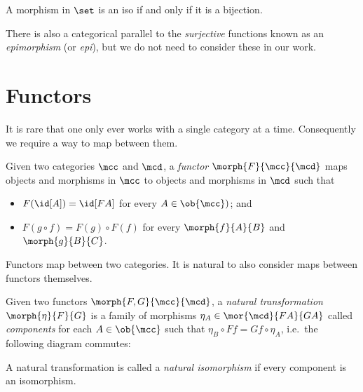 \begin{example}
    A morphism in \(\set\) is an iso if and only if it is a bijection.
\end{example}

\begin{remark}
    There is also a categorical parallel to the \emph{surjective} functions
    known as an \emph{epimorphism} (or \emph{epi}), but we do not need to
    consider these in our work.
\end{remark}

\section{Functors}

It is rare that one only ever works with a single category at a time.
Consequently we require a way to map between them.

\begin{definition}[Functor]
    Given two categories \(\mcc\) and \(\mcd\), a \emph{functor} \(
        \morph{F}{\mcc}{\mcd}
    \) maps objects and morphisms in \(\mcc\) to objects and morphisms in
    \(\mcd\) such that
    \begin{itemize}
        \item \(F(\id[A]) = \id[FA]\) for every \(A \in \ob{\mcc})\); and
        \item \(F(g \circ f) = F(g) \circ F(f)\) for every \(\morph{f}{A}{B}\)
        and \(\morph{g}{B}{C}\).
    \end{itemize}
\end{definition}

Functors map between two categories.
It is natural to also consider maps between functors themselves.

\begin{definition}
    Given two functors \(\morph{F, G}{\mcc}{\mcd}\), a
    \emph{natural transformation} \(\morph{\eta}{F}{G}\) is a family of
    morphisms \(
        \eta_A \in \mor{\mcd}{FA}{GA}
    \) called \emph{components} for each \(A \in \ob{\mcc}\) such that \(
        \eta_B \circ Ff = Gf \circ \eta_A
    \), i.e.\ the following diagram commutes:
    \begin{center}
        
    \end{center}
    A natural transformation is called a \emph{natural isomorphism} if
    every component is an isomorphism.
\end{definition}

